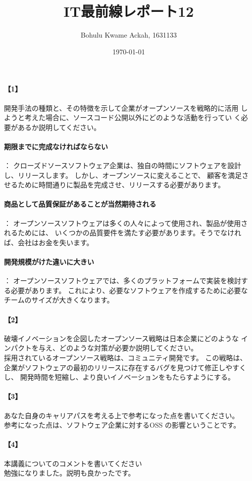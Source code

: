 \documentclass[20 pts]{article}
\title{IT最前線レポート12}
\author{Bohulu Kwame Ackah, 1631133}
\date{\today}
\begin{document}
\maketitle

\newpage
\paragraph{【1】}開発手法の種類と、その特徴を示して企業がオープンソースを戦略的に活用
しようと考えた場合に、ソースコード公開以外にどのような活動を行ってい
く必要があるか説明してください。 \\
\paragraph{期限までに完成なければならない}：
クローズドソースソフトウェア企業は、独自の時間にソフトウェアを設計し、リリースします。
 しかし、オープンソースに変えることで、
顧客を満足させるために時間通りに製品を完成させ、リリースする必要があります。
\vspace{8mm}
\paragraph{商品として品質保証があることが当然期待される}：
オープンソースソフトウェアは多くの人々によって使用され、製品が使用されるためには、
いくつかの品質要件を満たす必要があります。そうでなければ、会社はお金を失います。
\vspace{8mm}　　　　　　　　　　
\paragraph{開発規模がけた違いに大きい}：
オープンソースソフトウェアでは、多くのプラットフォームで実装を検討する必要があります。 
これにより、必要なソフトウェアを作成するために必要なチームのサイズが大きくなります。



\vspace{8mm}
\paragraph{【2】}破壊イノベーションを企図したオープンソース戦略は日本企業にどのような
インパクトを与え、どのような対策が必要か説明してください。\\

採用されているオープンソース戦略は、コミュニティ開発です。 この戦略は、
企業がソフトウェアの最初のリリースに存在するバグを見つけて修正しやすくし、
開発時間を短縮し、より良いイノベーションをもたらすようにする。




\newpage
\paragraph{【3】}あなた自身のキャリアパスを考える上で参考になった点を書いてください。\\
参考になった点は、ソフトウェア企業に対するOSS の影響ということです。



\paragraph{【4】}本講義についてのコメントを書いてください\\
勉強になりました。説明も良かったです。
\end{document}
